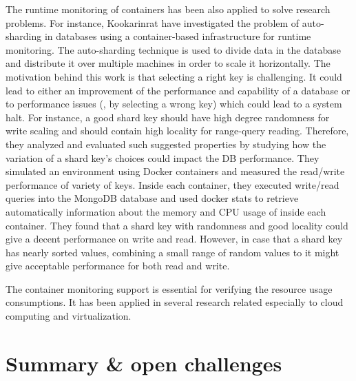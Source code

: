 The runtime monitoring of containers has been also applied to solve research problems. For instance, Kookarinrat \etal\cite{kookarinrat2015analysis} have investigated the problem of auto-sharding in  databases using a container-based infrastructure for runtime monitoring. 
The auto-sharding technique is used to divide data in the database and distribute it over multiple machines in order to scale it horizontally. The motivation behind this work is that selecting a right key is challenging. It could lead to either an improvement of the performance and capability of a database or to performance issues (\ie, by selecting a wrong key) which could lead to a system halt. 
For instance, a good shard key should have high degree randomness for write scaling and should contain high locality for range-query reading.
Therefore, they analyzed and evaluated such suggested properties by studying how the variation of a shard key’s choices could impact the DB performance.
They simulated an environment using Docker containers and measured the read/write performance of variety of keys. Inside each container, they executed write/read queries into the MongoDB database and used docker stats to retrieve automatically information about the memory and CPU usage of inside each container.
They found that a shard key with randomness and good locality could give a decent performance on write and
read. However, in case that a shard key has nearly sorted values, combining a small range of random values to it might give acceptable performance for both read and write. 

The container monitoring support is essential for verifying the resource usage consumptions. It has been applied in several research  related especially to cloud computing and virtualization\cite{peinl2016docker,medel2016modelling}.
\section{Summary \& open challenges}
\label{sec:suumary SOTA}

